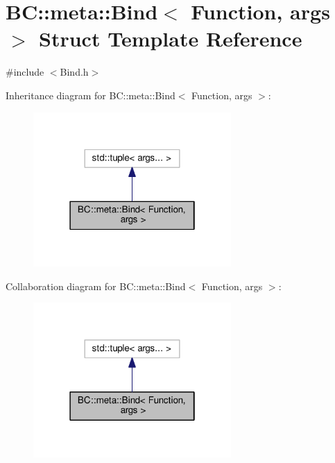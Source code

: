 \hypertarget{structBC_1_1meta_1_1Bind}{}\section{BC\+:\+:meta\+:\+:Bind$<$ Function, args $>$ Struct Template Reference}
\label{structBC_1_1meta_1_1Bind}


{\ttfamily \#include $<$Bind.\+h$>$}



Inheritance diagram for BC\+:\+:meta\+:\+:Bind$<$ Function, args $>$\+:
\nopagebreak
\begin{figure}[H]
\begin{center}
\leavevmode
\includegraphics[width=214pt]{structBC_1_1meta_1_1Bind__inherit__graph}
\end{center}
\end{figure}


Collaboration diagram for BC\+:\+:meta\+:\+:Bind$<$ Function, args $>$\+:
\nopagebreak
\begin{figure}[H]
\begin{center}
\leavevmode
\includegraphics[width=214pt]{structBC_1_1meta_1_1Bind__coll__graph}
\end{center}
\end{figure}
